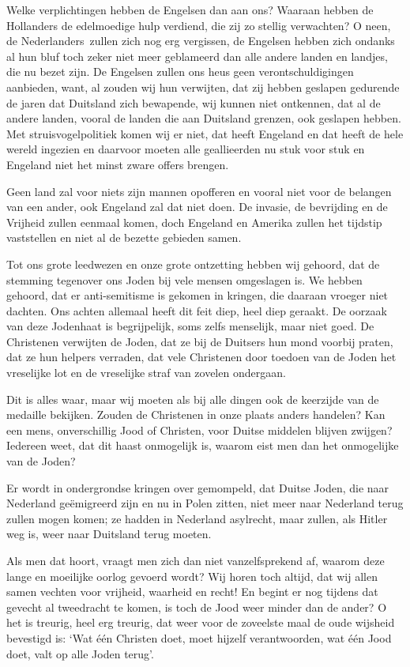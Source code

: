 \documentclass{book}
\begin{document}
Welke verplichtingen hebben de Engelsen dan aan ons? Waaraan hebben de
Hollanders de edelmoedige hulp verdiend, die zij zo stellig verwachten?  O neen,
de Nederlanders~zullen zich nog erg vergissen, de Engelsen hebben zich ondanks
al hun bluf toch zeker niet meer geblameerd dan alle andere landen en landjes,
die nu bezet zijn. De Engelsen zullen ons heus geen verontschuldigingen
aanbieden, want, al zouden wij hun verwijten, dat zij hebben geslapen gedurende
de jaren dat Duitsland zich bewapende, wij kunnen niet ontkennen, dat al de
andere landen, vooral de landen die aan Duitsland grenzen, ook geslapen hebben.
Met struisvogelpolitiek komen wij er niet, dat heeft Engeland en dat heeft de
hele wereld ingezien en daarvoor moeten alle geallieerden nu stuk voor stuk en
Engeland niet het minst zware offers brengen.

Geen land zal voor niets zijn mannen opofferen en vooral niet voor de belangen
van een ander, ook Engeland zal dat niet doen. De invasie, de bevrijding en de
Vrijheid zullen eenmaal komen, doch Engeland en Amerika zullen het tijdstip
vaststellen en niet al de bezette gebieden samen.

Tot ons grote leedwezen en onze grote ontzetting hebben wij gehoord, dat de
stemming tegenover ons Joden bij vele mensen omgeslagen is. We hebben gehoord,
dat er anti-semitisme is gekomen in kringen, die daaraan vroeger niet dachten.
Ons achten allemaal heeft dit feit diep, heel diep geraakt. De oorzaak van deze
Jodenhaat is begrijpelijk, soms zelfs menselijk, maar niet goed. De Christenen
verwijten de Joden, dat ze bij de Duitsers hun mond voorbij praten, dat ze hun
helpers verraden, dat vele Christenen door toedoen van de Joden het vreselijke
lot en de vreselijke straf van zovelen ondergaan.

Dit is alles waar, maar wij moeten als bij alle dingen ook de keerzijde van de
medaille bekijken. Zouden de Christenen in onze plaats anders handelen? Kan een
mens, onverschillig Jood of Christen, voor Duitse middelen blijven zwijgen?
Iedereen weet, dat dit haast onmogelijk is, waarom eist men dan het onmogelijke
van de Joden?

Er wordt in ondergrondse kringen over gemompeld, dat Duitse Joden, die naar
Nederland geëmigreerd zijn en nu in Polen zitten, niet meer naar Nederland terug
zullen mogen komen; ze hadden in Nederland asylrecht, maar zullen, als Hitler
weg is, weer naar Duitsland terug moeten.

Als men dat hoort, vraagt men zich dan niet vanzelfsprekend af, waarom deze
lange en moeilijke oorlog gevoerd wordt? Wij horen toch altijd, dat wij allen
samen vechten voor vrijheid, waarheid en recht! En begint er nog tijdens dat
gevecht al tweedracht te komen, is toch de Jood weer minder dan de ander? O het
is treurig, heel erg treurig, dat weer voor de zoveelste maal de oude wijsheid
bevestigd is: `Wat één Christen doet, moet hijzelf verantwoorden, wat één Jood
doet, valt op alle Joden terug'.
\end{document}
